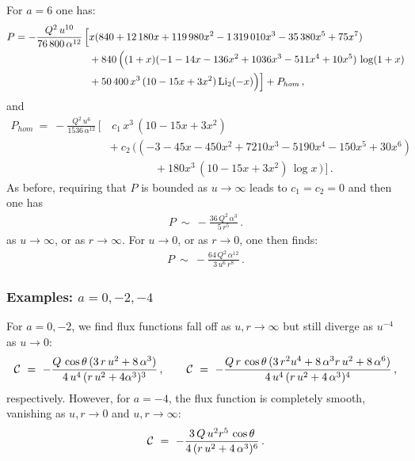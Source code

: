 \documentclass[11pt]{article}
\def\cC{{\cal C}}
\numberwithin{equation}{section}
\begin{document}
For $a=6$ one has:
%
\begin{equation}
\begin{aligned}
P  = -\frac{Q^2\, u^{10}}{76\,800 \,\alpha^{12}} \,\Big[& x( 840  +12\,180x   +119\,980 x^2 -1\,319\,010 x^3 -35\,380  x^5 + 75 x^7 ) \\
&+840\,\Big((1+x)  (-1 -14 x -136 x^2 +1036 x^3 -511 x^4 +10 x^5 ) \, \log (1+x)\\
&  + 50\,400 \, x^3 \,(10 -15 x +3 x^2 )\, {\rm Li}_2 (-x)  \Big) \Big] + P_{hom} \,,
\end{aligned}
\label{Ppart6}
\end{equation}
%
and 
%
\begin{equation}
\begin{aligned}
P_{hom}   ~=~ -\frac{Q^2\, u^6}{1536 \,\alpha^{12}} \, \Big[&\, c_1 \,x^3 \,(10 -15 x +3 x^2 )\,  \\
&+~ c_2 \, \Big( (-3 -45 x -450 x^2 +7210 x^3 -5190 x^4 -150 x^5 + 30 x^6) \\
&  \qquad\qquad +180 x^3\,(10 -15 x +3 x^2 )\, \log x\, \Big) \,  \Big]   \,.
\end{aligned}
\label{Phom6}
\end{equation}
%
As before, requiring that $P$ is bounded as $u \to \infty$ leads to $c_1 =c_2 =0$ and then one has
%
\begin{equation}
\begin{aligned}
P   ~\sim~  -\frac{36\, Q^2\,\alpha^{3}}{5  \, r^5 }  \,.
\end{aligned}
\label{Pasymp6}
\end{equation}
%
as $u \to \infty$, or as $r \to \infty$.   For $u \to 0$, or as $r \to 0$, one then finds: 
%
\begin{equation}
\begin{aligned}
P   ~\sim~  -\frac{64\, Q^2 \, \alpha^{12}}{3 \, u^6 \, r^8 }  \,.
\end{aligned}
\label{Pasymp6a}
\end{equation}
%



\subsubsection{Examples: $a = 0, -2, -4$}
\label{ss:example3} 

For $a =0, -2$, we  find flux functions fall off as  $u,r \to \infty$ but still diverge as $u^{-4}$ as $u \to 0$: 
% 
\begin{equation}
\cC ~=~   - \frac{Q\,  \cos \theta \,(3\,   r\, u^2 + 8 \,\alpha^3) }{4\, u^4 \, (r\, u^2 + 4\alpha^3)^3  }\,, \qquad \cC ~=~   - \frac{Q\, r\,  \cos \theta \,(3\, r^2 u^4 + 8\, \alpha^3 r\, u^2 +  8 \,\alpha^6 ) }{4\, u^4 \, (r\, u^2 + 4\,\alpha^3 )^4  } \,,
 \label{C3part0-2}
\end{equation}
%
respectively. However, for $a=-4$, the flux function is  completely smooth, vanishing as $u, r \to 0$ and  $u,r \to \infty$:
% 
\begin{equation}
\cC ~=~   - \frac{3\, Q\,u^2 r^5 \,  \cos \theta  }{4\, (r\, u^2 + 4\,\alpha^3 )^6  } \,.
 \label{C3part-4}
\end{equation}
%
\end{document}
